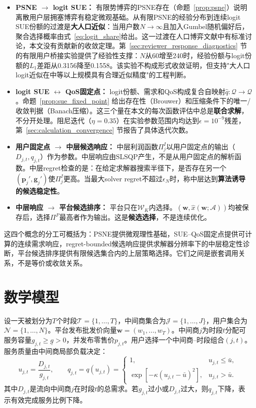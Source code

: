 \documentclass[UTF8,11pt]{ctexart}
\newcommand{\qos}{q}
\newcommand{\T}{\mathcal{T}}
\newcommand{\J}{\mathcal{J}}
\newcommand{\N}{\mathcal{N}}
\newcommand{\D}{D}
\newcommand{\w}{\boldsymbol{w}}
\newcommand{\p}{\boldsymbol{p}}
\newcommand{\g}{\boldsymbol{g}}
\begin{document}
\begin{itemize}[leftmargin=2em]
  \item \textbf{PSNE $\to$ logit SUE：} 有限势博弈的PSNE存在（命题~\ref{prop:psne}）说明离散用户层拥塞博弈有稳定微观基础。从有限PSNE的经验分布到连续logit SUE份额的过渡是\textbf{大人口近似}：当用户数$N\to\infty$且加入Gumbel随机偏好后，聚合选择概率由式~\eqref{eq:logit_share}给出。这一过渡在人口博弈文献中有标准讨论\cite{sandholm2010population}，本文没有贡献新的收敛定理。第~\ref{sec:reviewer_response_diagnostics} 节的有限用户桥接实验提供了经验性支撑：$N$从60增至240时，经验份额与logit份额的$L_1$差距从0.3156降至0.1558。该实验不构成形式收敛证明，但支持"大人口logit近似在中等以上规模具有合理近似精度"的工程判断。
  \item \textbf{logit SUE $\leftrightarrow$ QoS固定点：} logit份额、需求和QoS构成复合自映射$\widehat q:\mathcal{Q}\to\mathcal{Q}$。命题~\ref{prop:sue_fixed_point} 给出存在性（Brouwer）和压缩条件下的唯一/收敛判据（Banach压缩）。这三个量在本文的每次函数评估中总是\textbf{联合求解}，不分开处理。阻尼迭代（$\eta=0.35$）在实验参数范围内均达到$\epsilon=10^{-9}$残差，第~\ref{sec:calculation_convergence} 节报告了具体迭代次数。
  \item \textbf{用户固定点 $\to$ 中层候选响应：} 中层利润函数$\Pi^I_j$以用户固定点的输出（$\D_{j,t},q_{j,t}$）作为参数。中层响应由SLSQP产生，不是从用户固定点的解析函数。中层regret检查的是：在给定求解器搜索半径下，是否存在另一个$(\p_j',\g_j')$使$\Pi^I_j$更高。当最大solver regret不超过$\epsilon_N$时，称中层达到\textbf{算法诱导的候选稳定性}。
  \item \textbf{中层响应 $\to$ 平台候选排序：} 平台只在$\mathcal{W}_K$内选择。$(\w,\widehat x(\w;\mathcal{A}))$均被保存后，选择$\Pi^P$最高者作为输出。这是\textbf{候选选择}，不是连续优化。
\end{itemize}
这四个概念的分工可概括为：PSNE提供微观理性基础，SUE--QoS固定点提供可计算的连续需求响应，regret-bounded候选响应提供求解器分辨率下的中层稳定性诊断，平台候选排序提供有限候选集合内的上层策略选择。它们之间是嵌套调用关系，不是等价或收敛关系。

\section{数学模型}
\label{sec:formulation}

设一天被划分为$T$个时段$\T=\{1,\ldots,T\}$，中间商集合为$\J=\{1,\ldots,J\}$，用户集合为$\N=\{1,\ldots,N\}$。平台发布批发价向量$\w=(w_1,\ldots,w_T)$。中间商$j$为时段$t$分配可服务容量$g_{j,t}\ge \underline g>0$，并发布零售价$p_{j,t}$。用户选择一个中间商--时段组合$(j,t)$。服务质量由中间商局部负载决定：
\begin{equation}
  u_{j,t}=\frac{\D_{j,t}}{g_{j,t}},\qquad
  q_{j,t}=\qos(u_{j,t})=
  \begin{cases}
    1, & u_{j,t}\le \bar u,\\
    \exp[-\kappa(u_{j,t}-\bar u)^2], & u_{j,t}>\bar u.
  \end{cases}
  \label{eq:qos}
\end{equation}
其中$\D_{j,t}$是流向中间商$j$在时段$t$的总需求。若$g_{j,t}$过小或$\D_{j,t}$过大，则$q_{j,t}$下降，表示有效完成服务比例下降。
\end{document}
